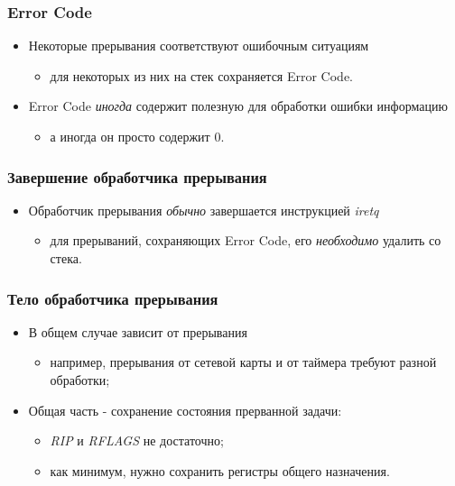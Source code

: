 \begin{frame}
\frametitle{Error Code}
\begin{itemize}
    \item<1-> Некоторые прерывания соответствуют ошибочным ситуациям
    \begin{itemize}
        \item<1-> для некоторых из них на стек сохраняется Error Code.
    \end{itemize}
    \item<2-> Error Code \emph{иногда} содержит полезную для обработки
    ошибки информацию
    \begin{itemize}
        \item<3-> а иногда он просто содержит 0.
    \end{itemize}
\end{itemize}
\end{frame}

\begin{frame}
\frametitle{Завершение обработчика прерывания}
\begin{itemize}
    \item<1-> Обработчик прерывания \emph{обычно} завершается
    инструкцией \emph{iretq}
    \begin{itemize}
        \item для прерываний, сохраняющих Error Code, его \emph{необходимо}
        удалить со стека.
    \end{itemize}
\end{itemize}
\end{frame}

\begin{frame}
\frametitle{Тело обработчика прерывания}
\begin{itemize}
    \item<1->В общем случае зависит от прерывания
    \begin{itemize}
        \item например, прерывания от сетевой карты и от таймера требуют
        разной обработки;
    \end{itemize}
    \item<2->Общая часть - сохранение состояния прерванной задачи:
    \begin{itemize}
        \item \emph{RIP} и \emph{RFLAGS} не достаточно;
        \item<3->как минимум, нужно сохранить регистры общего назначения.
    \end{itemize}
\end{itemize}
\end{frame}

